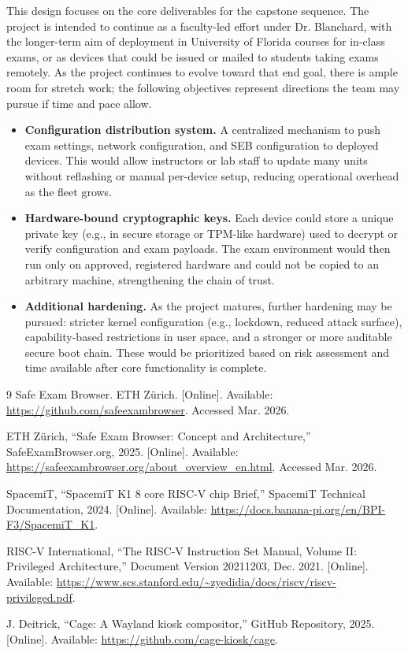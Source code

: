 \documentclass[11pt]{article}
\begin{document}
This design focuses on the core deliverables for the capstone sequence. The project is intended to continue as a faculty-led effort under Dr. Blanchard, with the longer-term aim of deployment in University of Florida courses for in-class exams, or as devices that could be issued or mailed to students taking exams remotely. As the project continues to evolve toward that end goal, there is ample room for stretch work; the following objectives represent directions the team may pursue if time and pace allow.

\begin{itemize}
    \item \textbf{Configuration distribution system.} A centralized mechanism to push exam settings, network configuration, and SEB configuration to deployed devices. This would allow instructors or lab staff to update many units without reflashing or manual per-device setup, reducing operational overhead as the fleet grows.
    \item \textbf{Hardware-bound cryptographic keys.} Each device could store a unique private key (e.g., in secure storage or TPM-like hardware) used to decrypt or verify configuration and exam payloads. The exam environment would then run only on approved, registered hardware and could not be copied to an arbitrary machine, strengthening the chain of trust.
    \item \textbf{Additional hardening.} As the project matures, further hardening may be pursued: stricter kernel configuration (e.g., lockdown, reduced attack surface), capability-based restrictions in user space, and a stronger or more auditable secure boot chain. These would be prioritized based on risk assessment and time available after core functionality is complete.
\end{itemize}

\newpage
\begin{thebibliography}{9}
Safe Exam Browser. ETH Zürich. [Online]. Available: \url{https://github.com/safeexambrowser}. Accessed Mar. 2026.

ETH Zürich, ``Safe Exam Browser: Concept and Architecture,'' SafeExamBrowser.org, 2025. [Online]. Available: \url{https://safeexambrowser.org/about_overview_en.html}. Accessed Mar. 2026.

SpacemiT, ``SpacemiT K1 8 core RISC-V chip Brief,'' SpacemiT Technical Documentation, 2024. [Online]. Available: \url{https://docs.banana-pi.org/en/BPI-F3/SpacemiT_K1}.

RISC-V International, ``The RISC-V Instruction Set Manual, Volume II: Privileged Architecture,'' Document Version 20211203, Dec. 2021. [Online]. \\Available: \url{https://www.scs.stanford.edu/~zyedidia/docs/riscv/riscv-privileged.pdf}.

J. Deitrick, ``Cage: A Wayland kiosk compositor,'' GitHub Repository, 2025. [Online]. Available: \url{https://github.com/cage-kiosk/cage}.
\end{thebibliography}
\end{document}

